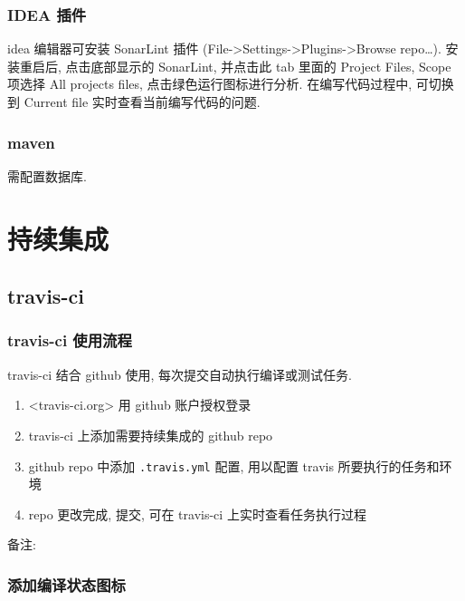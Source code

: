 \subsubsection{IDEA 插件}\label{idea-ux63d2ux4ef6-1}

idea 编辑器可安装 SonarLint 插件
(File-\textgreater{}Settings-\textgreater{}Plugins-\textgreater{}Browse
repo\ldots{}). 安装重启后, 点击底部显示的 SonarLint, 并点击此 tab 里面的
Project Files, Scope 项选择 All projects files,
点击绿色运行图标进行分析. 在编写代码过程中, 可切换到 Current file
实时查看当前编写代码的问题.

\subsubsection{maven}\label{maven-2}

需配置数据库.

\section{持续集成}\label{ux6301ux7eedux96c6ux6210}

\subsection{travis-ci}\label{travis-ci}

\subsubsection{travis-ci
使用流程}\label{travis-ci-ux4f7fux7528ux6d41ux7a0b}

travis-ci 结合 github 使用, 每次提交自动执行编译或测试任务.

\begin{enumerate}
\def\labelenumi{\arabic{enumi}.}
\tightlist
\item
  \textless{}travis-ci.org\textgreater{} 用 github 账户授权登录
\item
  travis-ci 上添加需要持续集成的 github repo
\item
  github repo 中添加 \lstinline!.travis.yml! 配置, 用以配置 travis
  所要执行的任务和环境
\item
  repo 更改完成, 提交, 可在 travis-ci 上实时查看任务执行过程
\end{enumerate}

备注:

\subsubsection{添加编译状态图标}\label{ux6dfbux52a0ux7f16ux8bd1ux72b6ux6001ux56feux6807}


